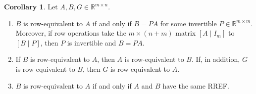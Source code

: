 \documentclass[12pt]{article}
\newcommand{\R}{\mathbb R}
\theoremstyle{definition}
\newtheorem{corollary}[theorem]{Corollary}
\begin{document}
\begin{corollary}\label{r2-cor-row-equivalent}
Let \(A,B,G\in\R^{m\times n}\).
\begin{enumerate}
\item \(B\) is row-equivalent to \(A\) if and only if \(B=PA\) for some invertible \(P\in\R^{m\times m}\).
Moreover, if row operations take the \(m\times(n+m)\) matrix \([A\mid I_m]\) to \([B\mid P]\), then \(P\) is
invertible and \(B=PA\).
\item If \(B\) is row-equivalent to \(A\), then \(A\) is row-equivalent to \(B\). If, in addition, \(G\) is
row-equivalent to \(B\), then \(G\) is row-equivalent to \(A\).
\item \(B\) is row-equivalent to \(A\) if and only if \(A\) and \(B\) have the same RREF.
\end{enumerate}
\end{corollary}
\end{document}
